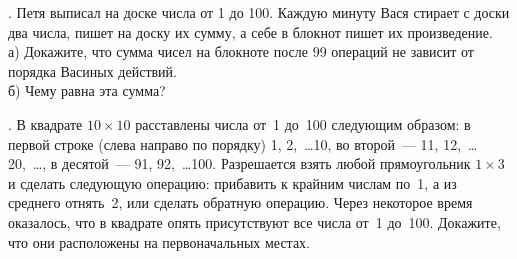 . Петя выписал на доске числа от 1 до 100. Каждую минуту Вася стирает с доски два числа, пишет на доску их сумму, а себе в блокнот пишет их произведение. \\
а) Докажите, что сумма чисел  на блокноте после 99 операций не зависит от порядка Васиных действий.\\
б) Чему равна эта сумма?


 . В квадрате $10\times10$ расставлены числа от~1 до~100 следующим образом: в первой строке (слева направо 
по порядку) 1, 2,~\dots 10, во второй~--- 11, 12,~\dots 20,~\dots, в десятой~--- 91, 92,~\dots 100. Разрешается 
взять любой прямоугольник $1\times3$ и сделать следующую операцию: прибавить к крайним числам по~1, а из 
среднего отнять~2, или сделать обратную операцию. Через некоторое время оказалось, что в квадрате опять 
присутствуют все числа от~1 до~100. Докажите, что они расположены на первоначальных местах.